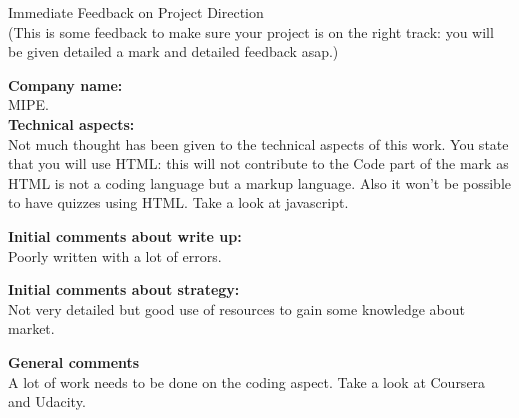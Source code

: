\documentclass{article}
\begin{document}
\begin{center}
\Huge{Immediate Feedback on Project Direction}\\
\tiny{(This is some feedback to make sure your project is on the right track: you will be given detailed a mark and detailed feedback asap.)}
\end{center}


\normalsize
\textbf{Company name:}\\

MIPE. \\

\textbf{Technical aspects:}\\

Not much thought has been given to the technical aspects of this work.
You state that you will use HTML: this will not contribute to the Code part of the mark as HTML is not a coding language but a markup language.
Also it won't be possible to have quizzes using HTML.
Take a look at javascript.

\textbf{Initial comments about write up:}\\

Poorly written with a lot of errors.

\textbf{Initial comments about strategy:}\\

Not very detailed but good use of resources to gain some knowledge about market.

\textbf{General comments}\\

A lot of work needs to be done on the coding aspect.
Take a look at Coursera and Udacity.
\end{document}

